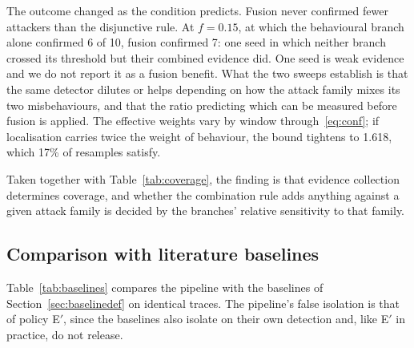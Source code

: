 The outcome changed as the condition predicts. Fusion never confirmed fewer
attackers than the disjunctive rule. At $f = 0.15$, at which the behavioural
branch alone confirmed 6 of 10, fusion confirmed 7: one seed in which neither
branch crossed its threshold but their combined evidence did. One seed is weak
evidence and we do not report it as a fusion benefit. What the two sweeps
establish is that the same detector dilutes or helps depending on how the
attack family mixes its two misbehaviours, and that the ratio predicting which
can be measured before fusion is applied. The effective weights vary by window
through~\eqref{eq:conf}; if localisation carries twice the weight of behaviour,
the bound tightens to 1.618, which 17\% of resamples satisfy.

Taken together with Table~\ref{tab:coverage}, the finding is that evidence
collection determines coverage, and whether the combination rule adds anything
against a given attack family is decided by the branches' relative
sensitivity to that family.

\subsection{Comparison with literature baselines}
\label{sec:baselines}

Table~\ref{tab:baselines} compares the pipeline with the baselines of
Section~\ref{sec:baselinedef} on identical traces. The pipeline's false
isolation is that of policy E$'$, since the baselines also isolate on their
own detection and, like E$'$ in practice, do not release.

